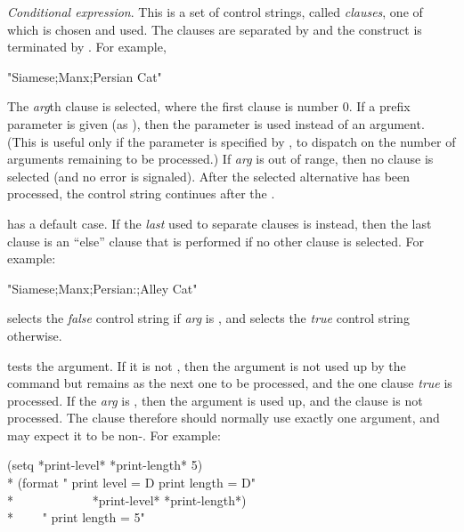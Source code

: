 \begin{flushdesc}
\item[\cd{{\Xtilde}{\Xlbracket}\emph{str0}{\Xtilde};\emph{str1}{\Xtilde};\emph{...}{\Xtilde};\emph{strn}{\Xtilde}{\Xrbracket}}]
\emph{Conditional expression}.
This is a set of control strings, called \emph{clauses}, one of which is
chosen and used.  The clauses are separated by \cd{{\Xtilde};} and the construct
is terminated by \cd{{\Xtilde}{\Xrbracket}}.  For example,
\begin{lisp}
"{\Xtilde}{\Xlbracket}Siamese{\Xtilde};Manx{\Xtilde};Persian{\Xtilde}{\Xrbracket} Cat"
\end{lisp}
The \emph{arg}th
clause is selected, where the first clause is number 0.
If a prefix parameter is given (as ),
then the parameter is used instead of an argument.
(This is useful only if the parameter is specified by \cd{\#},
to dispatch on the number of arguments remaining to be processed.)
If \emph{arg} is out of range, then no clause is selected
(and no error is signaled).
After the selected alternative has been processed, the control string
continues after the \cd{{\Xtilde}{\Xrbracket}}.

 has a default case.
If the \emph{last} \cd{{\Xtilde};} used to separate clauses
is \cd{{\Xtilde}:;} instead, then the last clause is an ``else'' clause
that is performed if no other clause is selected.
For example:
\begin{lisp}
"{\Xtilde}{\Xlbracket}Siamese{\Xtilde};Manx{\Xtilde};Persian{\Xtilde}:;Alley{\Xtilde}{\Xrbracket} Cat"
\end{lisp}

 selects the \emph{false} control string
if \emph{arg} is {\false}, and selects the \emph{true} control string otherwise.

 tests the argument.  If it is not {\false},
then the argument is not used up by the \cd{{\Xtilde}{\Xatsign}{\Xlbracket}} command
but remains as the next one to be processed,
and the one clause \emph{true} is processed.
If the \emph{arg} is {\false}, then the argument is used up,
and the clause is not processed.
The clause therefore should normally use exactly one argument,
and may expect it to be non-{\false}.
For example:
\begin{lisp}
(setq *print-level* {\false} *print-length* 5) \\*
(format {\false} "{\Xtilde}{\Xatsign}{\Xlbracket} print level = {\Xtilde}D{\Xtilde}{\Xrbracket}{\Xtilde}{\Xatsign}{\Xlbracket} print length = {\Xtilde}D{\Xtilde}{\Xrbracket}" \\*
~~~~~~~~~~~~*print-level* *print-length*) \\*
~~~\EV\  " print length = 5"
\end{lisp}


\end{flushdesc}
